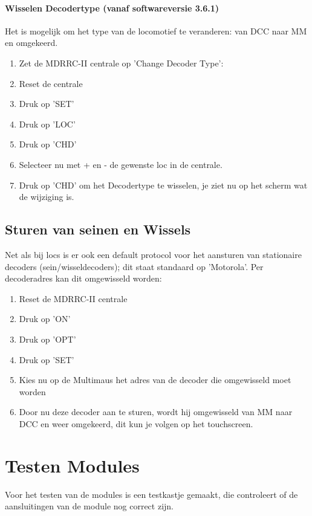 \documentclass[12pt,a4paper]{report}
\begin{document}
\subsubsection{Wisselen Decodertype (vanaf softwareversie 3.6.1)}
Het is mogelijk om het type van de locomotief te veranderen: van DCC naar MM en omgekeerd.
\begin{enumerate}
\item Zet de MDRRC-II centrale op 'Change Decoder Type': 
\item Reset de centrale
\item Druk op 'SET'
\item Druk op 'LOC'
\item Druk op 'CHD'
\item Selecteer nu met + en - de gewenste loc in de centrale.
\item Druk op 'CHD' om het Decodertype te wisselen, je ziet nu op het scherm wat de wijziging is.
\end{enumerate}

\section{Sturen van seinen en Wissels}
Net als bij locs is er ook een default protocol voor het aansturen van stationaire decoders (sein/wisseldecoders); dit staat standaard op 'Motorola'.
Per decoderadres kan dit omgewisseld worden:

\begin{enumerate}
\item Reset de MDRRC-II centrale
\item Druk op 'ON'
\item Druk op 'OPT'
\item Druk op 'SET'
\item Kies nu op de Multimaus het adres van de decoder die omgewisseld moet worden
\item Door nu deze decoder aan te sturen, wordt hij omgewisseld van MM naar DCC en weer omgekeerd, dit kun je volgen op het touchscreen.
\end{enumerate}

\appendix

\chapter{Testen Modules}
\label{ch:testen}
Voor het testen van de modules is een testkastje gemaakt, die controleert of de aansluitingen van de module nog correct zijn.
\end{document}

